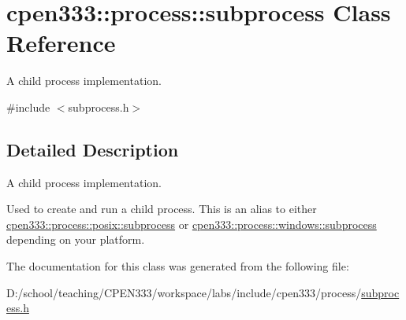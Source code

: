 \hypertarget{classcpen333_1_1process_1_1subprocess}{}\section{cpen333\+:\+:process\+:\+:subprocess Class Reference}
\label{classcpen333_1_1process_1_1subprocess}


A child process implementation.  




{\ttfamily \#include $<$subprocess.\+h$>$}



\subsection{Detailed Description}
A child process implementation. 

Used to create and run a child process. This is an alias to either \hyperlink{classcpen333_1_1process_1_1posix_1_1subprocess}{cpen333\+::process\+::posix\+::subprocess} or \hyperlink{classcpen333_1_1process_1_1windows_1_1subprocess}{cpen333\+::process\+::windows\+::subprocess} depending on your platform. 

The documentation for this class was generated from the following file\+:\begin{DoxyCompactItemize}
\item 
D\+:/school/teaching/\+C\+P\+E\+N333/workspace/labs/include/cpen333/process/\hyperlink{subprocess_8h}{subprocess.\+h}\end{DoxyCompactItemize}

